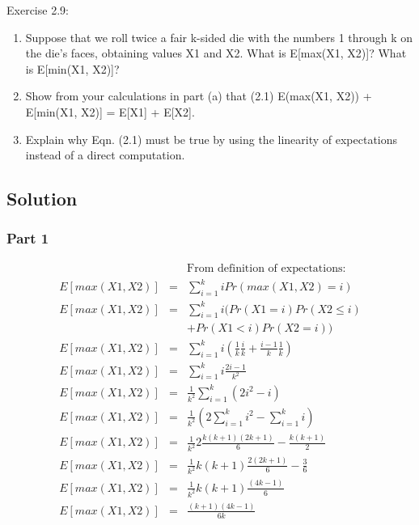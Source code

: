 \documentclass[10pt]{article}
\begin{document}
Exercise 2.9:

\begin{enumerate}

\item       Suppose that we roll twice a fair k-sided die with the numbers 1 through k on the die's faces, obtaining values X1 and X2. What is E[max(X1, X2)]? What is E[min(X1, X2)]?

\item       Show from your calculations in part (a) that (2.1) E(max(X1, X2)) + E[min(X1, X2)] = E[X1] + E[X2].

\item       Explain why Eqn. (2.1) must be true by using the linearity of expectations instead of a direct computation.

\end{enumerate}

\subsection{Solution}

\subsubsection*{Part 1}

\begin{eqnarray}
&&\text{From definition of expectations:}\\
E[max(X1, X2)] &=& \sum_{i=1}^{k} i Pr(max(X1, X2)=i)\\
E[max(X1, X2)] &=& \sum_{i=1}^{k} i (Pr(X1=i)Pr(X2 \leq i) \\
&&+ Pr(X1<i)Pr(X2=i))\\
E[max(X1, X2)] &=& \sum_{i=1}^{k} i (\frac{1}{k}\frac{i}{k} + \frac{i-1}{k}\frac{1}{k})\\
E[max(X1, X2)] &=& \sum_{i=1}^{k} i \frac{2i-1}{k^{2}}\\
E[max(X1, X2)] &=& \frac{1}{k^{2}}\sum_{i=1}^{k} (2i^{2}-i)\\
E[max(X1, X2)] &=& \frac{1}{k^{2}}(2\sum_{i=1}^{k} i^{2}-\sum_{i=1}^{k} i)\\
E[max(X1, X2)] &=& \frac{1}{k^{2}}2\frac{k(k+1)(2k+1)}{6}-\frac{k(k+1)}{2}\\
E[max(X1, X2)] &=& \frac{1}{k^{2}}k(k+1)\frac{2(2k+1)}{6}-\frac{3}{6}\\
E[max(X1, X2)] &=& \frac{1}{k^{2}}k(k+1)\frac{(4k-1)}{6}\\
E[max(X1, X2)] &=& \frac{(k+1)(4k-1)}{6k}\\
\end{eqnarray}
\end{document}
